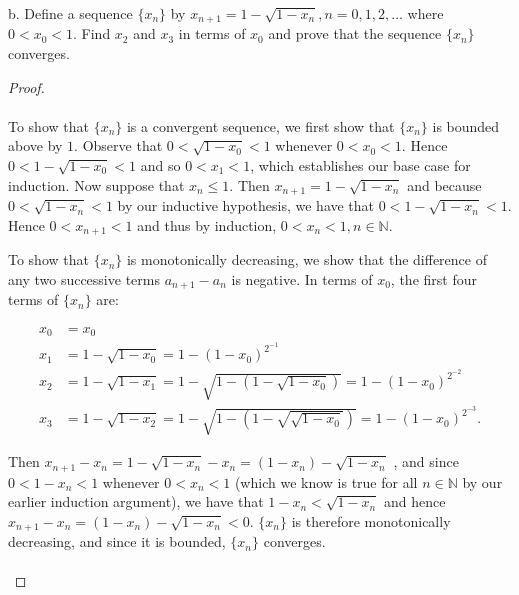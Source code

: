 b.  Define a sequence 
    $\{x_n\}$ by $x_{n+1} = 1 - \sqrt{1 - x_n}, n = 0, 1, 2, \ldots$ where
    $0 < x_0 < 1$. Find $x_2$ and $x_3$ in terms of $x_0$ and prove that the
    sequence $\{x_n\}$ converges.

    \begin{proof}\ \\\\

        To show that $\{x_n\}$ is a convergent sequence, we first show that
        $\{x_n\}$ is bounded above by $1$. Observe that $0 < \sqrt{1 - x_0} < 1$
        whenever $0 < x_0 < 1$. Hence $0 < 1 - \sqrt{1 - x_0} < 1$ and so 
        $0 < x_1 < 1$, which establishes our base case for induction. Now
        suppose that $x_n \le 1$. Then $x_{n+1} = 1 - \sqrt{1 - x_n}$ and
        because $0 < \sqrt{1 - x_n} < 1$ by our inductive hypothesis, we have
        that $0 < 1 - \sqrt{1 - x_n} < 1$. Hence 
        $0 < x_{n+1} < 1$ and thus by induction,
         $0 < x_n < 1, n \in \mathbb{N}$.

        To show that $\{x_n\}$ is monotonically decreasing, we show that the
        difference of any two successive terms $a_{n+1} - a_n$ is negative.
        In terms of $x_0$, the first four terms of $\{x_n\}$ are:

        \begin{align*}
            x_0 &= x_0 \\
            x_1 &= 1 - \sqrt{1 - x_0}
                 = 1 - \left(1 - x_0\right)^{2^{-1}} \\
            x_2 &= 1 - \sqrt{1 - x_1}
                 = 1 - \sqrt{1 - \left(1 - \sqrt{1 - x_0}\right)}
                 = 1 - \left(1 - x_0\right)^{2^{-2}} \\ 
            x_3 &= 1 - \sqrt{1 - x_2}
                 = 1 - \sqrt{1 - \left(1 - \sqrt{\sqrt{1 - x_0}}\right)}
                 = 1 - \left(1 - x_0\right)^{2^{-3}}.
        \end{align*}

        Then $x_{n+1} - x_n = 1 - \sqrt{1 - x_n} - x_n = (1 - x_n) - \sqrt{1 - x_n}$
        , and since $0 < 1 - x_n < 1$ whenever $0 < x_n < 1$ (which we know
        is true for all $n \in \mathbb{N}$ by our earlier induction argument),
        we have that $1 - x_n < \sqrt{1 - x_n}$ and hence
        $x_{n+1} - x_n = \left(1 - x_n\right) - \sqrt{1 - x_n} < 0$.
        $\{x_n\}$ is therefore monotonically decreasing, and since it is
        bounded, $\{x_n\}$ converges.
        \\\\
    \end{proof}